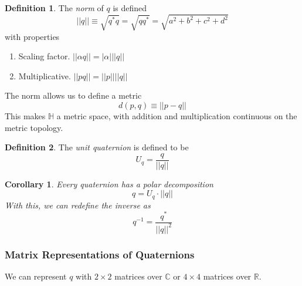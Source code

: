 \documentclass{article}
\newtheorem{corollary}{Corollary}[theorem]
\theoremstyle{remark}
\theoremstyle{definition}
\newtheorem{definition}{Definition}[section]
\begin{document}
\begin{definition}
The \textit{norm} of $q$ is defined
\[||q|| \equiv \sqrt{q^* q} = \sqrt{q q^*} = \sqrt{a^2 + b^2 + c^2 + d^2}\]
with properties
\begin{enumerate}
    \item Scaling factor. $||\alpha q|| = |\alpha| ||q||$
    \item Multiplicative. $||p q|| = ||p|| ||q||$
\end{enumerate}
\end{definition}

The norm allows us to define a metric 
\[d(p, q) \equiv ||p - q||\]
This makes $\mathbb{H}$ a metric space, with addition and multiplication continuous on the metric topology. 

\begin{definition}
The \textit{unit quaternion} is defined to be
\[U_q = \frac{q}{||q||}\]
\end{definition}

\begin{corollary}
Every quaternion has a polar decomposition
\[q = U_q \cdot ||q||\]
With this, we can redefine the inverse as
\[q^{-1} = \frac{q^*}{||q||^2}\]
\end{corollary}

\subsubsection{Matrix Representations of Quaternions}
We can represent $q$ with $2 \times 2$ matrices over $\mathbb{C}$ or $4\times 4 $ matrices over $\mathbb{R}$. 
\end{document}

